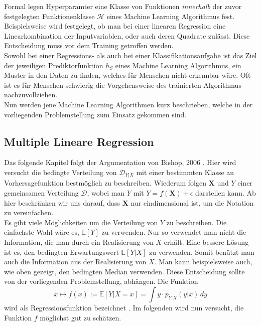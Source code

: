Formal legen Hyperparamter eine Klasse von Funktionen \textit{innerhalb} der zuvor festgelegten Funktionenklasse $\mathcal{H}$ eines Machine 
Learning Algorithmus fest. Beispielsweise wird festgelegt, ob man bei einer linearen Regression eine Linearkombination der Inputvariablen, oder auch deren Quadrate 
zul\"asst. Diese Entscheidung muss vor dem Training getroffen werden. \\


Sowohl bei einer Regressions- als auch bei einer Klassifikationsaufgabe ist das Ziel der jeweiligen Prediktorfunktion $h_S$ eines Machine Learning Algorithmus, 
ein Muster in den Daten zu finden, welches f\"ur Menschen nicht erkennbar w\"are. Oft ist es f\"ur Menschen schwierig die Vorgehensweise des trainierten Algorithmus 
nachzuvollziehen. \\

Nun werden jene Machine Learning Algorithmen kurz beschrieben, welche in der vorliegenden Problemstellung zum Einsatz gekommen sind.





























\subsection{Multiple Lineare Regression}

Das folgende Kapitel folgt der Argumentation von Bishop, 2006 \cite[Kapitel 3.1]{bishop}. Hier wird versucht die bedingte Verteilung von $\mathcal{D}_{Y|X}$ mit einer bestimmten Klasse an Vorhersagefunktion bestm\"oglich zu beschreiben. 
Wiederum folgen $\mathbf{X}$ und $Y$ einer gemeinsamen Verteilung $\mathcal{D}$, wobei man $Y$ mit $Y = f(\mathbf{X}) + \epsilon$ darstellen kann. 
Ab hier beschränken wir uns darauf, dass $\mathbf{X}$ nur eindimensional ist, um die Notation zu vereinfachen. \\

Es gibt viele M\"oglichkeiten um die Verteilung von $Y$ zu beschreiben. Die einfachste Wahl w\"are es, $\mathbb{E}[Y]$ zu verwenden. Nur so verwendet man nicht die 
Information, die man durch ein Realisierung von $X$ erh\"alt. Eine bessere L\"osung ist es, den bedingten Erwartungswert $\mathbb{E}[Y|X]$ zu verwenden. Somit ben\"utzt man auch die Information aus der 
Realisierung von $X$. Man kann beispielsweise auch, wie oben gezeigt, den bedingten Median verwenden. Diese Entscheidung sollte von der vorliegenden Problemstellung, 
abh\"angen. Die Funktion 
$$ x \mapsto f(x) := \mathbb{E}[Y|X = x] = \int y \cdot p_{Y|X}(y|x) \,dy $$
wird als Regressionsfunktion bezeichnet \cite[Seite 209]{wasserman}. Im folgenden wird nun versucht, die Funktion $f$ m\"oglichst gut zu sch\"atzen.\\


